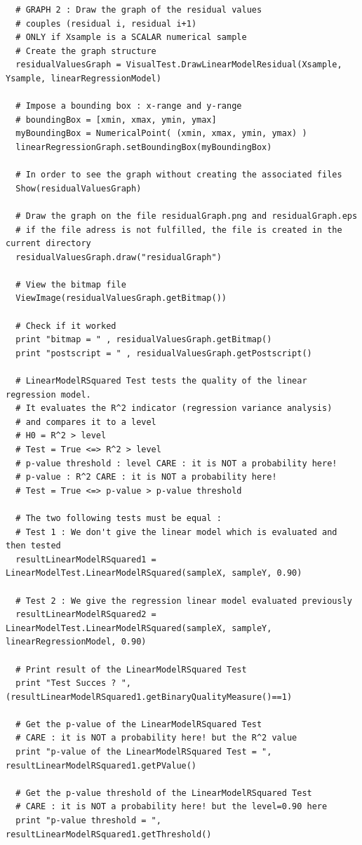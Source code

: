\begin{lstlisting}
  # GRAPH 2 : Draw the graph of the residual values
  # couples (residual i, residual i+1)
  # ONLY if Xsample is a SCALAR numerical sample
  # Create the graph structure
  residualValuesGraph = VisualTest.DrawLinearModelResidual(Xsample, Ysample, linearRegressionModel)

  # Impose a bounding box : x-range and y-range
  # boundingBox = [xmin, xmax, ymin, ymax]
  myBoundingBox = NumericalPoint( (xmin, xmax, ymin, ymax) )
  linearRegressionGraph.setBoundingBox(myBoundingBox)

  # In order to see the graph without creating the associated files
  Show(residualValuesGraph)

  # Draw the graph on the file residualGraph.png and residualGraph.eps
  # if the file adress is not fulfilled, the file is created in the current directory
  residualValuesGraph.draw("residualGraph")

  # View the bitmap file
  ViewImage(residualValuesGraph.getBitmap())

  # Check if it worked
  print "bitmap = " , residualValuesGraph.getBitmap()
  print "postscript = " , residualValuesGraph.getPostscript()

  # LinearModelRSquared Test tests the quality of the linear regression model.
  # It evaluates the R^2 indicator (regression variance analysis)
  # and compares it to a level
  # H0 = R^2 > level
  # Test = True <=> R^2 > level
  # p-value threshold : level CARE : it is NOT a probability here!
  # p-value : R^2 CARE : it is NOT a probability here!
  # Test = True <=> p-value > p-value threshold

  # The two following tests must be equal :
  # Test 1 : We don't give the linear model which is evaluated and then tested
  resultLinearModelRSquared1 = LinearModelTest.LinearModelRSquared(sampleX, sampleY, 0.90)

  # Test 2 : We give the regression linear model evaluated previously
  resultLinearModelRSquared2 = LinearModelTest.LinearModelRSquared(sampleX, sampleY, linearRegressionModel, 0.90)

  # Print result of the LinearModelRSquared Test
  print "Test Succes ? ", (resultLinearModelRSquared1.getBinaryQualityMeasure()==1)

  # Get the p-value of the LinearModelRSquared Test
  # CARE : it is NOT a probability here! but the R^2 value
  print "p-value of the LinearModelRSquared Test = ", resultLinearModelRSquared1.getPValue()

  # Get the p-value threshold of the LinearModelRSquared Test
  # CARE : it is NOT a probability here! but the level=0.90 here
  print "p-value threshold = ", resultLinearModelRSquared1.getThreshold()



\end{lstlisting}
